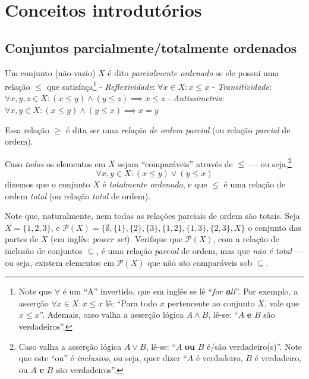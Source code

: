 \documentclass[12pt]{article}
\begin{document}
\hypertarget{conceitos-introdutuxf3rios}{%
\section{Conceitos introdutórios}\label{conceitos-introdutuxf3rios}}

\hypertarget{conjuntos-parcialmentetotalmente-ordenados}{%
\subsection{Conjuntos parcialmente/totalmente
ordenados}\label{conjuntos-parcialmentetotalmente-ordenados}}

Um conjunto (não-vazio) \(X\) é dito \emph{parcialmente ordenado} se ele
possui uma relação \(\leq\) que satisfaça\footnote{Note que \(\forall\)
  é um ``A'' invertido, que em inglês se lê ``\emph{for \textbf{a}ll}''.
  Por exemplo, a asserção \(\forall x \in X: x \leq x\) lê: ``Para todo
  \(x\) pertencente ao conjunto \(X\), vale que \(x \leq x\)''. Ademais,
  caso valha a asserção lógica \(A \land B\), lê-se: ``\(A\) \textbf{e}
  \(B\) são verdadeiros''.} - \emph{Reflexividade}:
\(\forall x \in X: x \leq x\) - \emph{Transitividade}:
\(\forall x, y, z \in X: (x \leq y) \land (y \leq z) \implies x \leq z\)
- \emph{Antissimetria}:
\(\forall x, y \in X: (x\leq y) \land (y \leq x) \implies x = y\)

Essa relação \(\geq\) é dita ser uma \emph{relação de ordem parcial} (ou
relação \emph{parcial} de ordem).

Caso \emph{todos} os elementos em \(X\) sejam ``comparáveis'' através de
\(\leq\) --- ou seja,\footnote{Caso valha a asserção lógica
  \(A \lor B\), lê-se: ``\(A\) \textbf{ou} \(B\) é/são verdadeiro(s)''.
  Note que este ``ou'' é \emph{inclusivo}, ou seja, quer dizer ``\(A\) é
  verdadeiro, \(B\) é verdadeiro, ou \(A\) \textbf{e} \(B\) são
  verdadeiros''.} \[
\forall x, y \in X: (x \leq y) \lor (y \leq x)
\] dizemos que o conjunto \(X\) é \emph{totalmente ordenado}, e que
\(\leq\) é uma relação de ordem \emph{total} (ou relação \emph{total} de
ordem).

Note que, naturalmente, nem todas as relações parciais de ordem são
totais. Seja \(X = \{ 1,2,3\}\), e
\(\mathcal{P}(X) = \{ \emptyset, \{ 1 \}, \{ 2 \}, \{ 3 \}, \{ 1,2 \}, \{ 1,3 \}, \{ 2,3 \}, X \}\)
o conjunto das partes de \(X\) (em inglês: \emph{power set}). Verifique
que \(\mathcal{P}(X)\), com a relação de inclusão de conjuntos
\(\subseteq\), é uma relação \emph{parcial} de ordem, mas que \emph{não
é total} --- ou seja, existem elementos em \(\mathcal{P}(X)\) que não
são comparáveis sob \(\subseteq\).
\end{document}
